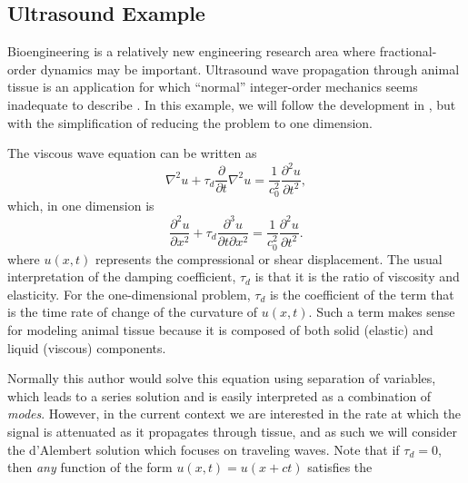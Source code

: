 \subsection{Ultrasound Example}

Bioengineering is a relatively new engineering research area where fractional-order dynamics may be important. Ultrasound wave propagation through animal tissue is an application for which ``normal'' integer-order mechanics seems inadequate to describe \cite{holm}. In this example, we will follow the development in \cite{holm}, but with the simplification of reducing the problem to one dimension.

The viscous wave equation can be written as
\begin{equation}
\nabla^2 u + \tau_d \frac{\partial}{\partial t} \nabla^2 u = \frac{1}{c_0^2} \frac{\partial^2 u}{\partial t^2},
\end{equation}
which, in one dimension is
\begin{equation}
\frac{\partial^2 u}{\partial x^2} + \tau_d \frac{\partial^3 u}{\partial t \partial x^2} =  \frac{1}{c_0^2} \frac{\partial^2 u}{\partial t^2}.
\label{eq:1dultra}
\end{equation}
where $u(x,t)$ represents the compressional or shear displacement. The usual interpretation of the damping coefficient, $\tau_d$ is that it is the ratio of viscosity and elasticity. For the one-dimensional problem, $\tau_d$ is the coefficient of the term that is the time rate of change of the curvature of $u(x,t)$. Such a term makes sense for modeling animal tissue because it is composed of both solid (elastic) and liquid (viscous) components.

Normally this author would solve this equation using separation of variables, which leads to a series solution and is easily interpreted as a combination of \emph{modes}. However, in the current context we are interested in the rate at which the signal is attenuated as it propagates through tissue, and as such we will consider the d'Alembert solution which focuses on traveling waves. Note that if $\tau_d=0$, then \emph{any} function of the form $u(x,t) = u(x + c t)$ satisfies the

